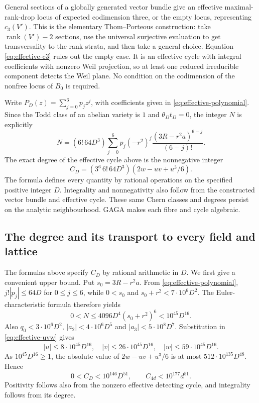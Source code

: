 \documentclass[11pt]{article}
\theoremstyle{definition}
\theoremstyle{remark}
\begin{document}
General sections of a globally generated vector bundle give
an effective maximal-rank-drop locus of expected codimension
three, or the empty locus, representing $c_3(V')$. This is the
elementary Thom--Porteous construction: take
$\operatorname{rank}(V')-2$ sections, use the universal surjective
evaluation to get transversality to the rank strata, and then
take a general choice. Equation \eqref{eq:effective-c3} rules out the empty case.
It is an effective cycle with integral coefficients with nonzero Weil projection,
so at least one reduced irreducible component detects the Weil
plane. No condition on the codimension of the nonfree locus of
$B_0$ is required.

Write $P_D(z)=\sum_{j=0}^6p_jz^j$, with coefficients given in
\eqref{eq:effective-polynomial}. Since the Todd class of an abelian variety is $1$ and
$\theta_Dt_D=0$, the integer $N$ is explicitly
\[
 N=(6!\,64D^3)\sum_{j=0}^6
       p_j(-r^2)^j\frac{(3R-r^2a)^{6-j}}{(6-j)!}.
\]
The exact degree of the effective cycle above is the nonnegative
integer
\begin{equation}\label{eq:effective-degree}
 C_D=(3^6\,6!\,64D^3)(2w-uv+u^3/6).                     
\end{equation}
The formula defines every quantity by rational operations on
the specified positive integer $D$. Integrality and nonnegativity
also follow from the constructed vector bundle and effective
cycle. These same Chern classes and degrees persist on the
analytic neighbourhood. GAGA makes each fibre and cycle algebraic.

\subsection{The degree and its transport to every field and lattice}
The formulas above specify $C_D$ by rational arithmetic in $D$. We first give a convenient upper bound. Put $s_0=3R-r^2a$. From \eqref{eq:effective-polynomial}, $j!|p_j|\le64D$ for $0\le j\le6$, while $0<s_0$ and $s_0+r^2<7\cdot10^6D^2$. The Euler-characteristic formula therefore yields
\[
 0<N\le4096D^4(s_0+r^2)^6<10^{45}D^{16}.
\]
Also $q_0<3\cdot10^6D^2$, $|a_2|<4\cdot10^6D^5$ and $|a_3|<5\cdot10^8D^7$. Substitution in \eqref{eq:effective-uvw} gives
\[
 |u|\le8\cdot10^{45}D^{16},\quad
 |v|\le26\cdot10^{45}D^{16},\quad
 |w|\le59\cdot10^{45}D^{16}.
\]
As $10^{45}D^{16}\ge1$, the absolute value of $2w-uv+u^3/6$ is at most $512\cdot10^{135}D^{48}$. Hence
\[
 0<C_D<10^{146}D^{51},\qquad C_{4d}<10^{177}d^{51}.
\]
Positivity follows also from the nonzero effective detecting cycle, and integrality follows from its degree.
\end{document}
